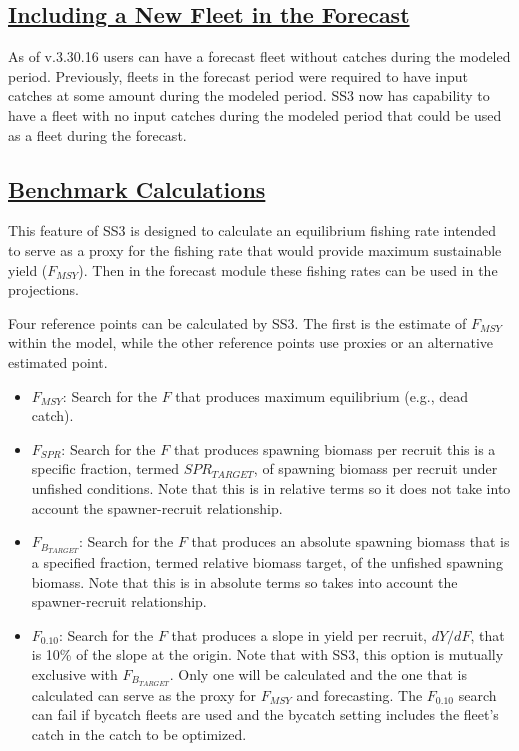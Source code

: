 \hypertarget{NewFleetForecast}{}
\subsection[Including a New Fleet in the Forecast]{\protect\hyperlink{NewFleetForecast}{Including a New Fleet in the Forecast}}
As of v.3.30.16 users can have a forecast fleet without catches during the modeled period. Previously, fleets in the forecast period were required to have input catches at some amount during the modeled period. SS3 now has capability to have a fleet with no input catches during the modeled period that could be used as a fleet during the forecast.

\hypertarget{Benchmark}{}
\subsection[Benchmark Calculations]{\protect\hyperlink{Benchmark}{Benchmark Calculations}}
This feature of SS3 is designed to calculate an equilibrium fishing rate intended to serve as a proxy for the fishing rate that would provide maximum sustainable yield ($F_{MSY}$). Then in the forecast module these fishing rates can be used in the projections.

Four reference points can be calculated by SS3. The first is the estimate of $F_{MSY}$ within the model, while the other reference points use proxies or an alternative estimated point.

\begin{itemize}
	\item $F_{MSY}$: Search for the $F$ that produces maximum equilibrium (e.g., dead catch).
	
	\item $F_{SPR}$: Search for the $F$ that produces spawning biomass per recruit this is a specific fraction, termed $SPR_{TARGET}$, of spawning biomass per recruit under unfished conditions. Note that this is in relative terms so it does not take into account the spawner-recruit relationship.
	
	\item $F_{B_{TARGET}}$: Search for the $F$ that produces an absolute spawning biomass that is a specified fraction, termed relative biomass target, of the unfished spawning biomass. Note that this is in absolute terms so takes into account the spawner-recruit relationship. 
	
	\item $F_{0.10}$: Search for the $F$ that produces a slope in yield per recruit, $dY/dF$, that is 10\% of the slope at the origin. Note that with SS3, this option is mutually exclusive with $F_{B_{TARGET}}$. Only one will be calculated and the one that is calculated can serve as the proxy for $F_{MSY}$ and forecasting. The $F_{0.10}$ search can fail if bycatch fleets are used and the bycatch setting includes the fleet's catch in the catch to be optimized.
\end{itemize}

